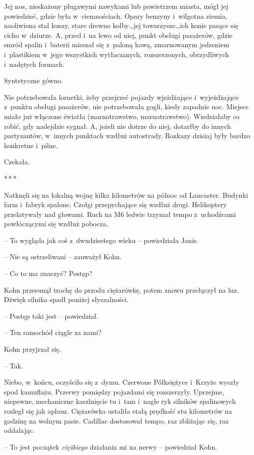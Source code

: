 \documentclass[oneside,polish,11pt,sfheadings]{mwbk}
\newcommand{\threeast}{\bigskip\par\centerline{*\,*\,*}\medskip\par}%
\begin{document}
Jej nos, nieskażony plugawymi nawykami lub powietrzem miasta, mógł jej
powiedzieć, gdzie była w~ciemnościach. Opary benzyny i~wilgotna ziemia,
naoliwiona stal kuszy, stare drewno kolby\ldots jej towarzysze\ldots ich konie
pasące się cicho w~dziurze. A, przed i~na lewo od niej, punkt obsługi
pasażerów, gdzie smród spalin i~baterii mieszał się z~paloną kawą,
zmarnowanym jedzeniem i~plastikiem w~jego wszystkich wytłaczanych,
rozszerzonych, obrzydliwych i~nadętych formach.

Syntetyczne gówno.

Nie potrzebowała lornetki, żeby przejrzeć pojazdy wjeżdżające i~wyjeżdżające z~punktu obsługi pasażerów, nie potrzebowała gogli, kiedy
zapadnie noc. Miejsce miało już włączone światła (marnotrawstwo,
marnotrawstwo). Wiedziałaby co robić, gdy nadejdzie sygnał. A, jeżeli
nie dotrze do niej, dotarłby do innych partyzantów, w~innych punktach
wzdłuż autostrady. Rozkazy dzisiaj były bardzo konkretne i~pilne.

Czekała.
  \threeast 

Natknęli się na lokalną wojnę kilka kilometrów na północ od Lancaster.
Budynki farm i~fabryk spalone. Czołgi przepychające się wzdłuż drogi.
Helikoptery przelatywały nad głowami. Ruch na M6 ledwie trzymał tempo z~uchodźcami powłóczącymi się wzdłuż pobocza.

-- To wygląda jak coś z~dwudziestego wieku -- powiedziała Janis.

-- Nie są ostrzeliwani -- zauważył Kohn.

-- Co to ma znaczyć? Postęp?

Kohn przesunął trochę do przodu ciężarówkę, potem znowu przełączył na
luz. Dźwięk silnika spadł poniżej słyszalności. 

-- Postęp taki jest -- powiedział.

-- Ten samochód ciągle za nami?

Kohn przyjrzał się. 

-- Tak.

Niebo, w~końcu, oczyściło się z~dymu. Czerwone Półksiężyce i~Krzyże
wyszły spod kamuflażu. Przerwy pomiędzy pojazdami się rozszerzyły.
Uprzejme, niepewne, mechaniczne kaszlnięcie tu i~tam i~nagle ryk
silników spalinowych rozległ się jak aplauz. Ciężarówka ustaliła stałą
prędkość stu kilometrów na godzinę na wolnym pasie. Cadillac dostosował
tempo, raz zbliżając się, raz oddalając.

-- To jest początek \emph{ciężkiego} działania mi na nerwy -- powiedział
Kohn.
\end{document}

